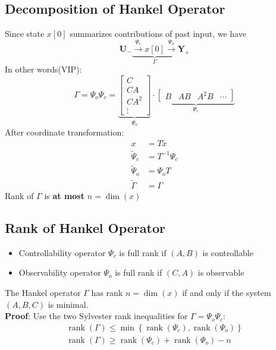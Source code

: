 \documentclass[10pt,a4paper,oneside]{article}
\begin{document}
\subsection{Decomposition of Hankel Operator}
Since state $x[0]$ summarizes contributions of past input, we have
\[
\mathbf{U}_{-} \underbrace{\stackrel{\Psi_{c}}{\longrightarrow} x[0] \stackrel{\Psi_{o}}{\longrightarrow}}_\text{$\Gamma$} \mathbf{Y}_{+}
\]
In other words(VIP):
\[
\Gamma=\Psi_{o} \Psi_{c}=\underbrace{
	\left[\begin{array}{c}{C} \\ {C A} \\ {C A^{2}} \\ {\vdots}\end{array}\right]
	}_\text{$\Psi_{o}$}\cdot\underbrace{
	\left[\begin{array}{llll}{B} & {A B} & {A^{2} B} & {\cdots}\end{array}\right]
	}_\text{$\Psi_{c}$}
\]
After coordinate transformation:
\begin{align*}
x &= T \tilde{x}\\
\tilde{\Psi}_{c} &= T^{-1} \Psi_{c}\\ 
\tilde{\Psi}_{o} &= \Psi_{o} T\\ 
\tilde{\Gamma} &= \Gamma
\end{align*}
Rank of $\Gamma$ is \textbf{at most} $n=\dim(x)$

\subsection{Rank of Hankel Operator}
\begin{itemize}
\item Controllability operator $\Psi_{c}$ is full rank if $(A,B)$ is controllable
\item Observability operator $\Psi_{o}$ is full rank if $(C,A)$ is observable
\end{itemize}
The Hankel operator $\Gamma$ has rank $n=\dim(x)$ if and only if the system $(A,B,C)$ is minimal.\\
\textbf{Proof}: Use the two Sylvester rank inequalities for $\Gamma=\Psi_{o}\Psi_{c}$:
\[
\begin{array}{l}{\operatorname{rank}(\Gamma) \leq \min \left\{\operatorname{rank}\left(\Psi_{c}\right), \operatorname{rank}\left(\Psi_{o}\right)\right\}} \\ {\operatorname{rank}(\Gamma) \geq \operatorname{rank}\left(\Psi_{c}\right)+\operatorname{rank}\left(\Psi_{o}\right)-n}\end{array}
\]
\end{document}
